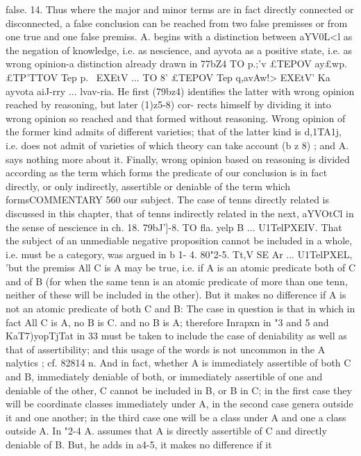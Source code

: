 {{{{{{{{{{{{{{false.
14. Thus where the major and minor terms are in fact directly
connected or disconnected, a false conclusion can be reached from
two false premisses or from one true and one false premiss.
A. begins with a distinction between aYV0L<l as the negation of
knowledge, i.e. as nescience, and ayvota as a positive state, i.e.
as wrong opinion-a distinction already drawn in 77bZ4 TO p.;'v
£TEPOV ay£wp.£TP'T}TOV Tep p.~ EXEtV ... TO 8' £TEPOV Tep q,avAw!> EXEtV'
Ka~ ~ ayvota aiJ-rry ... lvav-ria. He first (79bz4) identifies the latter
with wrong opinion reached by reasoning, but later (1)z5-8) cor-
rects himself by dividing it into wrong opinion so reached and
that formed without reasoning. Wrong opinion of the former
kind admits of different varieties; that of the latter kind is
d,1TA1j, i.e. does not admit of varieties of which theory can take
account (b z 8) ; and A. says nothing more about it. Finally, wrong
opinion based on reasoning is divided according as the term
which forms the predicate of our conclusion is in fact directly,
or only indirectly, assertible or deniable of the term which formsCOMMENTARY
560
our subject. The case of tenns directly related is discussed in
this chapter, that of tenns indirectly related in the next, aYVOtCl
in the sense of nescience in ch. 18.
79bJ']-8. TO fla. yelp B ... U1TelPXEIV. That the subject of an
unmediable negative proposition cannot be included in a whole,
i.e. must be a category, was argued in b 1- 4.
80"2-5. Tt,V SE Ar ... U1TelPXEL, 'but the premiss All C is A
may be true, i.e. if A is an atomic predicate both of C and of B
(for when the same tenn is an atomic predicate of more than one
tenn, neither of these will be included in the other). But it makes
no difference if A is not an atomic predicate of both C and B:
The case in question is that in which in fact All C is A, no B is C.
and no B is A; therefore Inrapxn in "3 and 5 and KaT7)yopTjTat in
33 must be taken to include the case of deniability as well as that
of assertibility; and this usage of the words is not uncommon in
the A nalytics ; cf. 82814 n. And in fact, whether A is immediately
assertible of both C and B, immediately deniable of both, or
immediately assertible of one and deniable of the other, C cannot
be included in B, or B in C; in the first case they will be coordinate
classes immediately under A, in the second case genera outside
it and one another; in the third case one will be a class under A
and one a class outside A.
In "2-4 A. assumes that A is directly assertible of C and directly
deniable of B. But, he adds in a4-5, it makes no difference if it
}}}}}}}}}}}}}
